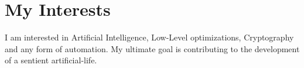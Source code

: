 \section*{My Interests}
I am interested in Artificial Intelligence, Low-Level optimizations, Cryptography and any form of automation.
My ultimate goal is contributing to the development of a sentient artificial-life.
